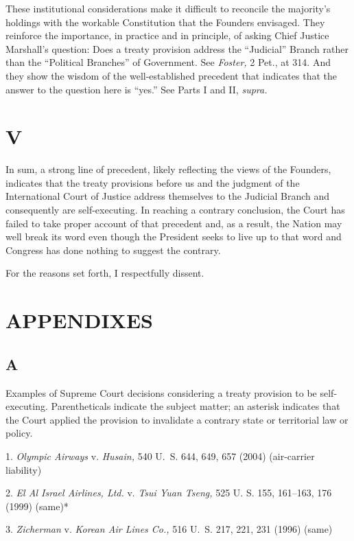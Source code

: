   These institutional considerations make it difficult to reconcile
the majority's holdings with the workable Constitution that the
Founders envisaged. They reinforce the importance, in practice and in
principle, of asking Chief Justice Marshall's question: Does a treaty
provision address the ``Judicial'' Branch rather than the ``Political
Branches'' of Government. See \emph{Foster,} 2 Pet., at 314. And they
show the wisdom of the well-established precedent that indicates that
the answer to the question here is ``yes.'' See Parts I and II,
\emph{supra.}

\section{V}

  In sum, a strong line of precedent, likely reflecting the views of
the Founders, indicates that the treaty provisions before us and the
judgment of the International Court of Justice address themselves to
the Judicial Branch and consequently are self-executing. In reaching
a contrary conclusion, the Court has failed to take proper account of
that precedent and, as a result, the Nation may well break its word even
though the President seeks to live up to that word and Congress has done
nothing to suggest the contrary.

  For the reasons set forth, I respectfully dissent.

\newpage 

\section{APPENDIXES}

\subsection{A}

  Examples of Supreme Court decisions considering a treaty provision
to be self-executing. Parentheticals indicate the subject matter; an
asterisk indicates that the Court applied the provision to invalidate a
contrary state or territorial law or policy.

    1. \emph{Olympic Airways} v. \emph{Husain,} 540 U.~S. 644, 649, 657
    (2004) (air-carrier liability)

    2. \emph{El Al Israel Airlines, Ltd.} v. \emph{Tsui Yuan Tseng,} 525 U.
    S. 155, 161--163, 176 (1999) (same)*

    3. \emph{Zicherman} v. \emph{Korean Air Lines Co.,} 516 U.~S. 217, 221,
    231 (1996) (same)

